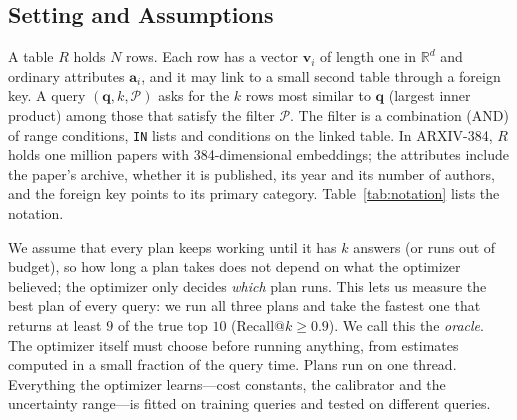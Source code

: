 \documentclass[sigconf,nonacm]{acmart}
\begin{document}
\subsection{Setting and Assumptions}\label{sec:setting}
A table $R$ holds $N$ rows. Each row has a vector $\mathbf{v}_i$ of length one in $\mathbb{R}^d$ and ordinary attributes $\mathbf{a}_i$, and it may link to a small second table through a foreign key. A query $(\mathbf{q},k,\mathcal{P})$ asks for the $k$ rows most similar to $\mathbf{q}$ (largest inner product) among those that satisfy the filter $\mathcal{P}$. The filter is a combination (AND) of range conditions, \texttt{IN} lists and conditions on the linked table. In ARXIV-384, $R$ holds one million papers with 384-dimensional embeddings; the attributes include the paper's archive, whether it is published, its year and its number of authors, and the foreign key points to its primary category. Table~\ref{tab:notation} lists the notation.

We assume that every plan keeps working until it has $k$ answers (or runs out of budget), so how long a plan takes does not depend on what the optimizer believed; the optimizer only decides \emph{which} plan runs. This lets us measure the best plan of every query: we run all three plans and take the fastest one that returns at least $9$ of the true top $10$ (Recall@$k\ge0.9$). We call this the \emph{oracle}. The optimizer itself must choose before running anything, from estimates computed in a small fraction of the query time. Plans run on one thread. Everything the optimizer learns---cost constants, the calibrator and the uncertainty range---is fitted on training queries and tested on different queries.
\end{document}
